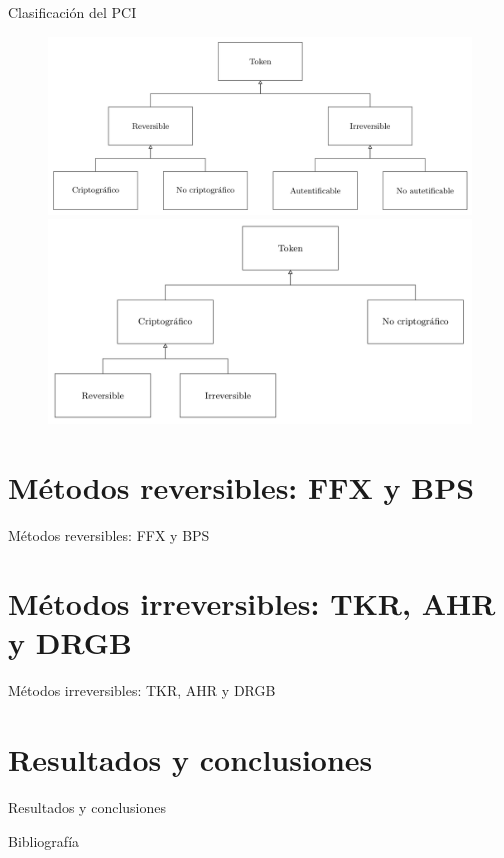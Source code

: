 \documentclass{beamer}
\begin{document}
  \begin{frame}{Clasificación del PCI}
    \begin{figure}[H]
      \begin{center}
        \includegraphics[width=0.8\linewidth]
          {presentacion_rci/diagramas/clasificacion_pci.png}
        \newline
        \newline
        \includegraphics[width=0.8\linewidth]
          {presentacion_rci/diagramas/clasificacion_propia.png}
      \end{center}
    \end{figure}
  \end{frame}

  \section{Métodos reversibles: FFX y BPS}

  \begin{frame}{Métodos reversibles: FFX y BPS}

  \end{frame}

  \section{Métodos irreversibles: TKR, AHR y DRGB}

  \begin{frame}{Métodos irreversibles: TKR, AHR y DRGB}

  \end{frame}

  \section{Resultados y conclusiones}

  \begin{frame}{Resultados y conclusiones}

  \end{frame}

  \begin{frame}[allowframebreaks]{Bibliografía}
    \printbibliography
  \end{frame}

  \setlength{\parskip}{0.0em}

  {
  \frame{\titlepage}}
\end{document}
